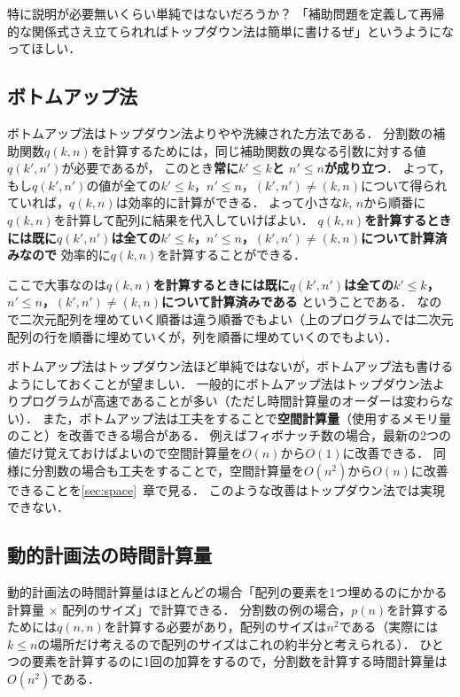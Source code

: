 \documentclass[a4paper,twoside,onecolumn,openany,article]{memoir}
\theoremstyle{remark}
\begin{document}

特に説明が必要無いくらい単純ではないだろうか？
「補助問題を定義して再帰的な関係式さえ立てられればトップダウン法は簡単に書けるぜ」というようになってほしい．

\subsection{ボトムアップ法}
ボトムアップ法はトップダウン法よりやや洗練された方法である．
分割数の補助関数$q(k,n)$を計算するためには，同じ補助関数の異なる引数に対する値$q(k',n')$が必要であるが，
このとき\textbf{常に$k'\le k$と $n'\le n$が成り立つ}．
よって，もし$q(k',n')$の値が全ての$k'\le k$，$n'\le n$，$(k',n')\ne(k,n)$について得られていれば，$q(k,n)$は効率的に計算ができる．
よって小さな$k$, $n$から順番に$q(k,n)$を計算して配列に結果を代入していけばよい．
\textbf{$q(k, n)$を計算するときには既に$q(k', n')$は全ての$k'\le k$，$n'\le n$，$(k',n')\ne (k,n)$について計算済みなので}
効率的に$q(k,n)$を計算することができる．


ここで大事なのは\textbf{$q(k, n)$を計算するときには既に$q(k', n')$は全ての$k'\le k$，$n'\le n$，$(k',n')\ne (k,n)$について計算済みである}
ということである．
なので二次元配列を埋めていく順番は違う順番でもよい（上のプログラムでは二次元配列の行を順番に埋めていくが，列を順番に埋めていくのでもよい）．

ボトムアップ法はトップダウン法ほど単純ではないが，ボトムアップ法も書けるようにしておくことが望ましい．
一般的にボトムアップ法はトップダウン法よりプログラムが高速であることが多い（ただし時間計算量のオーダーは変わらない）．
また，ボトムアップ法は工夫をすることで\textbf{空間計算量}（使用するメモリ量のこと）を改善できる場合がある．
例えばフィボナッチ数の場合，最新の2つの値だけ覚えておけばよいので空間計算量を$O(n)$から$O(1)$に改善できる．
同様に分割数の場合も工夫をすることで，空間計算量を$O(n^2)$から$O(n)$に改善できることを\ref{sec:space}~章で見る．
このような改善はトップダウン法では実現できない．


\subsection{動的計画法の時間計算量}
動的計画法の時間計算量はほとんどの場合「配列の要素を1つ埋めるのにかかる計算量 $\times$ 配列のサイズ」で計算できる．
分割数の例の場合，$p(n)$を計算するためには$q(n,n)$を計算する必要があり，配列のサイズは$n^2$である（実際には$k\le n$の場所だけ考えるので配列のサイズはこれの約半分と考えられる）．
ひとつの要素を計算するのに1回の加算をするので，分割数を計算する時間計算量は$O(n^2)$である．
\end{document}
